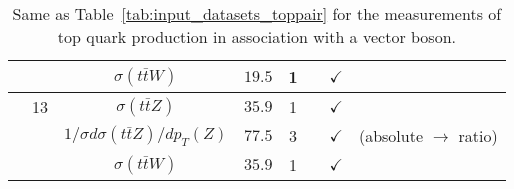 \begin{table}[t]
\begin{center}
{\begin{tabular}{lccccc|c|c}
    & 
    & $\sigma(t\bar{t}W)$
    & $19.5$
    & 1
    & \cite{Khachatryan:2015sha}
      & $\checkmark$                                                                     
      &  \\ \midrule
    & 13
    & $\sigma(t\bar{t}Z)$
    & $35.9$
    & 1
    & \cite{Sirunyan:2017uzs}
        & $\checkmark$                                                                     
      &  \\
    & 
    & $1/\sigma d\sigma(t\bar{t}Z)/dp_T(Z)$
    & $77.5$
    & 3
    & \cite{CMS:2019too}
      & $\checkmark$                                                                     
      & (absolute $\rightarrow$ ratio) \\
    & 
    & $\sigma(t\bar{t}W)$
    & $35.9$
    & 1
    &  \cite{Sirunyan:2017uzs}
       & $\checkmark$                                                                     
      &  \\
\bottomrule
   \end{tabular}
   \vspace{0.3cm}
   \caption{\small Same as Table~\ref{tab:input_datasets_toppair} for the measurements
     of top quark production
     in association with a vector boson.
     \label{tab:input_datasets2}
   }
}
\end{center}
\end{table}

